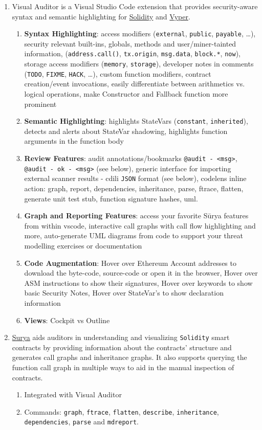 \begin{enumerate}
\item Visual Auditor is a Visual Studio Code extension that provides security-aware syntax and semantic highlighting for \href{https://marketplace.visualstudio.com/items?itemName=tintinweb-solidity-visual-auditor}{Solidity} and \href{https://marketplace.visualstudio.com/items?itemName=tintinweb.vscode-vyper}{Vyper}.
	\begin{enumerate}
	\item\textbf{Syntax Highlighting}: access modifiers (\verb|external|, \verb|public|, \verb|payable|, \dots), security relevant built-ins, globals, methods and user/miner-tainted information, (\verb|address.call()|, \verb|tx.origin|, \verb|msg.data|, \verb|block.*|, \verb|now|), storage access modifiers (\verb|memory|, \verb|storage|), developer notes in comments (\verb|TODO|, \verb|FIXME|, \verb|HACK|, \dots), custom function modifiers, contract creation/event invocations, easily differentiate between arithmetics vs. logical operations, make Constructor and Fallback function more prominent
	\item\textbf{Semantic Highlighting}: highlights StateVars (\verb|constant|, \verb|inherited|), detects and alerts about StateVar shadowing, highlights function arguments in the function body
	\item\textbf{Review Features}: audit annotations/bookmarks \verb|@audit - <msg>|, \verb|@audit - ok - <msg>| (see below), generic interface for importing external scanner results - cdili \verb|JSON| format (see below), codelens inline action: graph, report, dependencies, inheritance, parse, ftrace, flatten, generate unit test stub, function signature hashes, uml.
	\item\textbf{Graph and Reporting Features}: access your favorite Sūrya features from within vscode, interactive call graphs with call flow highlighting and more, auto-generate UML diagrams from code to support your threat modelling exercises or documentation
	\item\textbf{Code Augmentation}: Hover over Ethereum Account addresses to download the byte-code, source-code or open it in the browser, Hover over ASM instructions to show their signatures, Hover over keywords to show basic Security Notes, Hover over StateVar's to show declaration information
	\item\textbf{Views}: Cockpit vs Outline
	\end{enumerate}

\item\href{https://github.com/ConsenSys/surya}{Surya} aids auditors in understanding and visualizing \verb|Solidity| smart contracts by providing information about the contracts’ structure and generates call graphs and inheritance graphs. It also supports querying the function call graph in multiple ways to aid in the manual inspection of contracts.
	\begin{enumerate}
	\item Integrated with Visual Auditor
	\item Commands: \verb|graph|, \verb|ftrace|, \verb|flatten|, \verb|describe|, \verb|inheritance|, \verb|dependencies|, \verb|parse| and \verb|mdreport|.
	\end{enumerate}


\end{enumerate}
